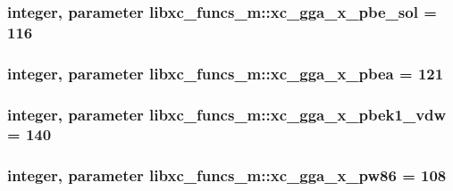 \hypertarget{classlibxc__funcs__m_a46b4224e51205ce3054b89362eff8e44}{
\subsubsection[{xc\-\_\-gga\-\_\-x\-\_\-pbe\-\_\-sol}]{\setlength{\rightskip}{0pt plus 5cm}integer, parameter libxc\-\_\-funcs\-\_\-m\-::xc\-\_\-gga\-\_\-x\-\_\-pbe\-\_\-sol = 116}}\label{classlibxc__funcs__m_a46b4224e51205ce3054b89362eff8e44}
\hypertarget{classlibxc__funcs__m_a23b9a3245f9e38fbeb8c889b30b8b441}{
\subsubsection[{xc\-\_\-gga\-\_\-x\-\_\-pbea}]{\setlength{\rightskip}{0pt plus 5cm}integer, parameter libxc\-\_\-funcs\-\_\-m\-::xc\-\_\-gga\-\_\-x\-\_\-pbea = 121}}\label{classlibxc__funcs__m_a23b9a3245f9e38fbeb8c889b30b8b441}
\hypertarget{classlibxc__funcs__m_a5d1a7fca680b5a2b5f5e53d2fd477bca}{
\subsubsection[{xc\-\_\-gga\-\_\-x\-\_\-pbek1\-\_\-vdw}]{\setlength{\rightskip}{0pt plus 5cm}integer, parameter libxc\-\_\-funcs\-\_\-m\-::xc\-\_\-gga\-\_\-x\-\_\-pbek1\-\_\-vdw = 140}}\label{classlibxc__funcs__m_a5d1a7fca680b5a2b5f5e53d2fd477bca}
\hypertarget{classlibxc__funcs__m_aa793fe506e0f50d0590901ba3a6811c8}{
\subsubsection[{xc\-\_\-gga\-\_\-x\-\_\-pw86}]{\setlength{\rightskip}{0pt plus 5cm}integer, parameter libxc\-\_\-funcs\-\_\-m\-::xc\-\_\-gga\-\_\-x\-\_\-pw86 = 108}}\label{classlibxc__funcs__m_aa793fe506e0f50d0590901ba3a6811c8}
